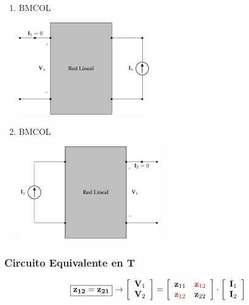 \begin{enumerate}
\item \hfill{}\textsc{BMCOL}
\label{sec:orgcc11e65}
\begin{center}
\includegraphics[height=4cm]{../figs/reciprocidadZ_entrada.pdf}
\end{center}
\item \hfill{}\textsc{BMCOL}
\label{sec:orgc53448d}
\begin{center}
\includegraphics[height=4cm]{../figs/reciprocidadZ_salida.pdf}
\end{center}
\end{enumerate}

\subsubsection{Circuito Equivalente en T}
\label{sec:orgf4a859d}

\[
\boxed{\mathbf{z_{12}} = \mathbf{z_{21}}}
\rightarrow
\left[
    \begin{array}{c}
      \mathbf{V}_1\\
      \mathbf{V}_2
    \end{array}
  \right] =
  \left[
    \begin{array}{cc}
      \mathbf{z}_{11} & \color{red}{\mathbf{z}_{12}}\\
      \color{red}{\mathbf{z}_{12}} & \mathbf{z}_{22}
    \end{array}
  \right] \cdot
  \left[
    \begin{array}{c}
      \mathbf{I}_1\\
      \mathbf{I}_2
    \end{array}
  \right]
\]

